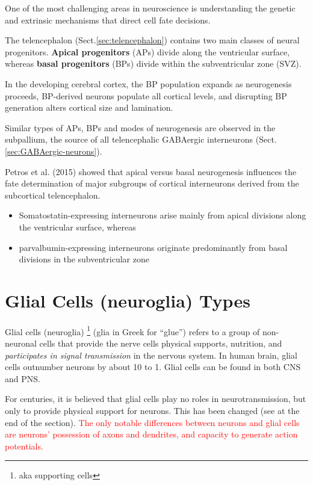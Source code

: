 One of the most challenging areas in neuroscience is understanding the genetic
and extrinsic mechanisms that direct cell fate decisions. 

The telencephalon (Sect.\ref{sec:telencephalon}) contains two main classes of
neural progenitors. {\bf Apical progenitors} (APs) divide along the ventricular
surface, whereas {\bf basal progenitors} (BPs) divide within the subventricular
zone (SVZ).

In the developing cerebral cortex, the BP population expands as neurogenesis
proceeds, BP-derived neurons populate all cortical levels, and disrupting BP
generation alters cortical size and lamination.

Similar types of APs, BPs and modes of neurogenesis are observed in the
subpallium, the source of all telencephalic GABAergic interneurons
(Sect.\ref{sec:GABAergic-neurons}).


Petros et al. (2015) showed that apical versus basal neurogenesis influences the
fate determination of major subgroups of cortical interneurons derived from the
subcortical telencephalon.
\begin{itemize}
  \item  Somatostatin-expressing interneurons arise mainly from apical divisions
  along the ventricular surface, whereas 
  \item parvalbumin-expressing interneurons
  originate predominantly from basal divisions in the subventricular zone 
\end{itemize}


\section{Glial Cells (neuroglia) Types}
\label{sec:glial-cells}

Glial cells (neuroglia) \footnote{aka supporting cells} (glia in Greek for
``glue'') refers to a group of non-neuronal cells that provide the nerve cells
physical supports, nutrition, and {\it participates in signal transmission} in
the nervous system. In human brain, glial cells outnumber neurons by about 10 to
1. Glial cells can be found in both CNS and PNS.


For centuries, it is believed that glial cells play no roles in
neurotransmission, but only to provide physical support for neurons. This has
been changed (see at the end of the section).
\textcolor{red}{The only notable differences between neurons and glial cells are
neurons' possession of axons and dendrites, and capacity to generate action
potentials.}

